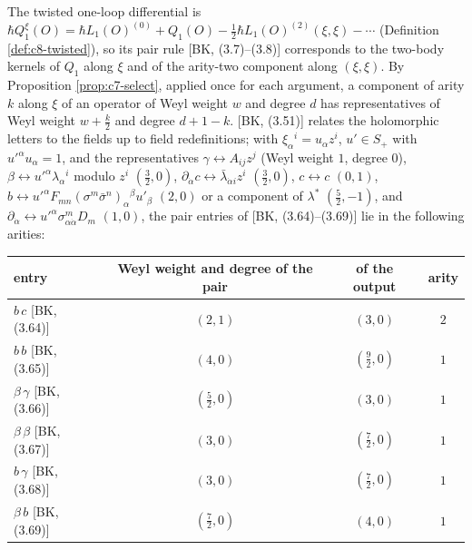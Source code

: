 \begin{remark}
\label{rem:c11-twist}
The twisted one-loop differential is $\hbar Q^\xi_1(O)=\hbar L_1(O)^{(0)}+Q_1(O)-\tfrac12\hbar L_1(O)^{(2)}(\xi,\xi)-\cdots$ (Definition \ref{def:c8-twisted}), so its pair rule [BK, (3.7)--(3.8)] corresponds to the two-body kernels of $Q_1$ along $\xi$ and of the arity-two component along $(\xi,\xi)$. By Proposition \ref{prop:c7-select}, applied once for each argument, a component of arity $k$ along $\xi$ of an operator of Weyl weight $w$ and degree $d$ has representatives of Weyl weight $w+\tfrac k2$ and degree $d+1-k$. [BK, (3.51)] relates the holomorphic letters to the fields up to field redefinitions; with $\xi_\alpha{}^i=u_\alpha z^i$, $u'\in S_+$ with $u'^\alpha u_\alpha=1$, and the representatives $\gamma\leftrightarrow A_{ij}z^j$ (Weyl weight $1$, degree $0$), $\beta\leftrightarrow u'^\alpha\lambda_\alpha{}^i$ modulo $z^i$ $(\tfrac32,0)$, $\partial_{\dot\alpha}c\leftrightarrow\bar\lambda_{\dot\alpha i}z^i$ $(\tfrac32,0)$, $c\leftrightarrow c$ $(0,1)$, $b\leftrightarrow u'^\alpha F_{mn}(\sigma^m\bar\sigma^n)_\alpha{}^\beta u'_\beta$ $(2,0)$ or a component of $\lambda^*$ $(\tfrac52,-1)$, and $\partial_{\dot\alpha}\leftrightarrow u'^\alpha\sigma^m_{\alpha\dot\alpha}D_m$ $(1,0)$, the pair entries of [BK, (3.64)--(3.69)] lie in the following arities:

\begin{tabular}{l|c|c|c}
entry & Weyl weight and degree of the pair & of the output & arity\\
\hline
$b\,c$ [BK, (3.64)] & $(2,1)$ & $(3,0)$ & $2$\\
$b\,b$ [BK, (3.65)] & $(4,0)$ & $(\tfrac92,0)$ & $1$\\
$\beta\,\gamma$ [BK, (3.66)] & $(\tfrac52,0)$ & $(3,0)$ & $1$\\
$\beta\,\beta$ [BK, (3.67)] & $(3,0)$ & $(\tfrac72,0)$ & $1$\\
$b\,\gamma$ [BK, (3.68)] & $(3,0)$ & $(\tfrac72,0)$ & $1$\\
$\beta\,b$ [BK, (3.69)] & $(\tfrac72,0)$ & $(4,0)$ & $1$\\
\end{tabular}


\end{remark}
